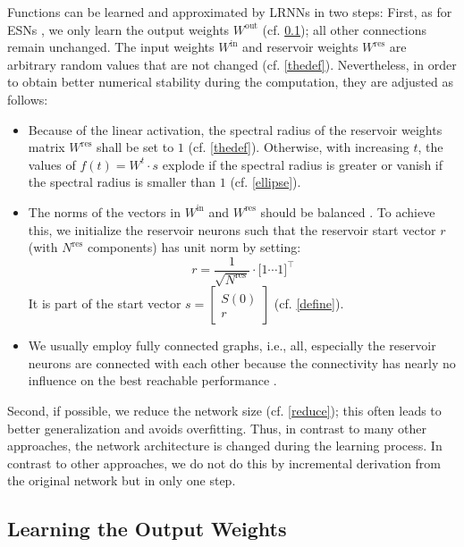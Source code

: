 \documentclass[twoside,11pt]{article}
\theoremstyle{definition}
\begin{document}
Functions can be learned and approximated by LRNNs in two steps: First, as for
ESNs \citep{JH04}, we only learn the output weights $W^\mathrm{out}$ (cf.
\cref{output}); all other connections remain unchanged. The input weights
$W^\mathrm{in}$ and reservoir weights $W^\mathrm{res}$ are arbitrary random
values that are not changed (cf. \cref{thedef}). Nevertheless, in order to
obtain better numerical stability during the computation, they are adjusted as
follows:
\begin{itemize}
  \item Because of the linear activation, the spectral radius of the reservoir
	weights matrix $W^\mathrm{res}$ shall be set to $1$ (cf. \cref{thedef}).
	Otherwise, with increasing $t$, the values of $f(t) = W^t \cdot s$
	explode if the spectral radius is greater or vanish if the spectral
	radius is smaller than $1$ (cf. \cref{ellipse}).
  \item The norms of the vectors in $W^\mathrm{in}$ and $W^\mathrm{res}$ should
        be balanced \citep{KLB12}. To achieve this, we initialize the reservoir
        neurons such that the reservoir start vector $r$ (with $N^\mathrm{res}$
        components) has unit norm by
        setting:
	\[ r = \frac{1}{\sqrt{N^\mathrm{res}}} \cdot \big[ 1 \cdots 1 \big]^\top \]
	It is part of the start vector $s = \left[ \begin{array}{c} S(0) \\ r
	\end{array} \right]$ (cf. \cref{define}).
  \item We usually employ fully connected graphs, i.e., all, especially the
	reservoir neurons are connected with each other because the
	connectivity has nearly no influence on the best reachable performance
	\citep{KLB12}.
\end{itemize}
Second, if possible, we reduce the network size (cf. \cref{reduce});
this often leads to better generalization and avoids overfitting. Thus, in
contrast to many other approaches, the network architecture is changed during
the learning process. In contrast to other approaches, we do not do this by
incremental derivation from the original network but in only one step.

\subsection{Learning the Output Weights}\label{output}
\end{document}
